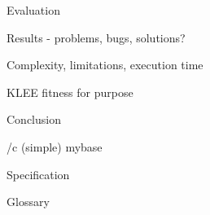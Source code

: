 \chap Evaluation

\sec Results - problems, bugs, solutions?


\sec Complexity, limitations, execution time

\sec KLEE fitness for purpose

\chap Conclusion



\bibchap
\usebib/c (simple) mybase


\app Specification



\app Glossary\par
\makeglos

\nextoddpage

\bye
